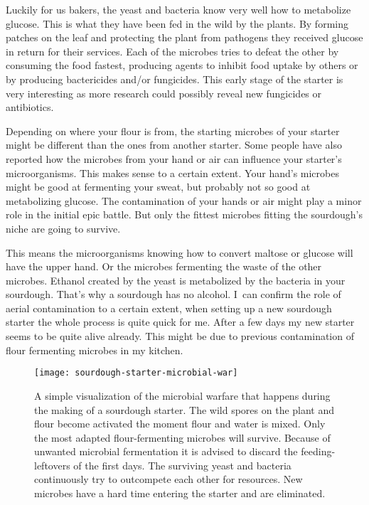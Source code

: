 Luckily for us
bakers, the yeast and bacteria know very well how to metabolize
glucose. This is what they have been fed in the wild by the plants.
By forming patches on the leaf and protecting the plant from
pathogens they received glucose in return for their services.
Each of the microbes tries to defeat the other by consuming the
food fastest, producing agents to inhibit food uptake by others or by producing
bactericides and/or fungicides. This early stage of the starter
is very interesting as more research could possibly reveal
new fungicides or antibiotics. 

Depending on where your flour
is from, the starting microbes of your starter might be different
than the ones from another starter. Some people have also reported
how the microbes from your hand or air can influence your starter's
microorganisms. This makes sense to a certain extent. Your
hand's microbes might be good at fermenting your sweat, but
probably not so good at metabolizing glucose. The contamination
of your hands or air might play a minor role in the initial epic
battle. But only the fittest microbes fitting the sourdough's
niche are going to survive. 

This means the microorganisms knowing
how to convert maltose or glucose will have the upper hand. Or the
microbes fermenting the waste of the other microbes. Ethanol created
by the yeast is metabolized by the bacteria in your sourdough. That's
why a sourdough has no alcohol. I~can confirm the role of aerial
contamination to a certain extent, when setting up a new sourdough
starter the whole process is quite quick for me. After a few
days my new starter seems to be quite alive already. This might
be due to previous contamination of flour fermenting microbes in
my kitchen.

\begin{figure}[!htb]
  \texttt{[image: sourdough-starter-microbial-war]}
  \caption[Microbial warfare during sourdough early days]{A simple
      visualization of the microbial warfare that happens during the making of
      a sourdough starter. The wild spores on the plant and flour become
      activated the moment flour and water is mixed.  Only the most adapted
      flour-fermenting microbes will survive. Because of unwanted microbial
      fermentation it is advised to discard the feeding-leftovers of the first
      days. The surviving yeast and bacteria continuously try to outcompete
      each other for resources. New microbes have a hard time entering the
      starter and are eliminated.}%
  \label{fig:sourdough-starter-microbial-war}
\end{figure}

